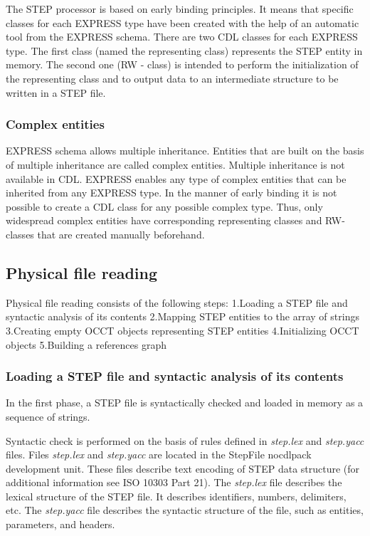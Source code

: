 The S\+T\+EP processor is based on early binding principles. It means that specific classes for each E\+X\+P\+R\+E\+SS type have been created with the help of an automatic tool from the E\+X\+P\+R\+E\+SS schema. There are two C\+DL classes for each E\+X\+P\+R\+E\+SS type. The first class (named the representing class) represents the S\+T\+EP entity in memory. The second one (RW -\/ class) is intended to perform the initialization of the representing class and to output data to an intermediate structure to be written in a S\+T\+EP file.\hypertarget{occt_user_guides__step_occt_step_4_1_2}{}\subsubsection{Complex entities}\label{occt_user_guides__step_occt_step_4_1_2}
E\+X\+P\+R\+E\+SS schema allows multiple inheritance. Entities that are built on the basis of multiple inheritance are called complex entities. Multiple inheritance is not available in C\+DL. E\+X\+P\+R\+E\+SS enables any type of complex entities that can be inherited from any E\+X\+P\+R\+E\+SS type. In the manner of early binding it is not possible to create a C\+DL class for any possible complex type. Thus, only widespread complex entities have corresponding representing classes and R\+W-\/classes that are created manually beforehand.\hypertarget{occt_user_guides__step_occt_step_4_2}{}\subsection{Physical file reading}\label{occt_user_guides__step_occt_step_4_2}
Physical file reading consists of the following steps\+: 1.\+Loading a S\+T\+EP file and syntactic analysis of its contents 2.\+Mapping S\+T\+EP entities to the array of strings 3.\+Creating empty O\+C\+CT objects representing S\+T\+EP entities 4.\+Initializing O\+C\+CT objects 5.\+Building a references graph\hypertarget{occt_user_guides__step_occt_step_4_2_1}{}\subsubsection{Loading a S\+T\+E\+P file and syntactic analysis of its contents}\label{occt_user_guides__step_occt_step_4_2_1}
In the first phase, a S\+T\+EP file is syntactically checked and loaded in memory as a sequence of strings.

Syntactic check is performed on the basis of rules defined in {\itshape step.\+lex} and {\itshape step.\+yacc} files. Files {\itshape step.\+lex} and {\itshape step.\+yacc} are located in the Step\+File nocdlpack development unit. These files describe text encoding of S\+T\+EP data structure (for additional information see I\+SO 10303 Part 21). The {\itshape step.\+lex} file describes the lexical structure of the S\+T\+EP file. It describes identifiers, numbers, delimiters, etc. The {\itshape step.\+yacc} file describes the syntactic structure of the file, such as entities, parameters, and headers.

